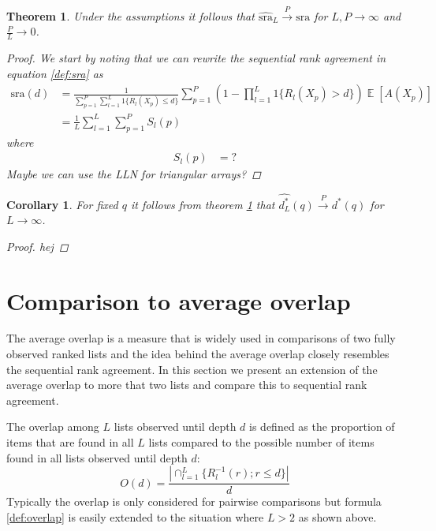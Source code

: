 \documentclass[12pt,a4paper]{article}
\DeclareMathOperator{\E}{\mathbb{E}}
\theoremstyle{plain}
\newtheorem{theorem}{Theorem}
\newtheorem{corollary}{Corollary}
\begin{document}
\begin{theorem}
Under the assumptions it follows that $\widehat{\textrm{sra}}_L \overset{P}{\longrightarrow} \textrm{sra}$ for $L,P\rightarrow \infty$ and $\frac{P}{L} \rightarrow 0$.
\begin{proof}
We start by noting that we can rewrite the sequential rank agreement in equation \ref{def:sra} as
\begin{align}
\textrm{sra}(d) &= \frac 1{\sum_{p=1}^P \sum_{l=1}^L 1\{R_l(X_p)\le d\}}\sum_{p=1}^P(1-\prod_{l=1}^L 1\{R_l(X_p)>d\}) \E[A(X_p)]\\
    &= \frac{1}{L} \sum_{l=1}^L \sum_{p=1}^P S_l(p)
\end{align}
where
\begin{align}
  S_l(p) &= ?
\end{align}
Maybe we can use the LLN for triangular arrays?
\end{proof}
\label{thm:consistency}
\end{theorem}


\begin{corollary}
For fixed $q$ it follows from theorem \ref{thm:consistency} that
$\widehat{d^\ast_L}(q) \overset{P}{\longrightarrow} d^\ast(q)$
for $L \rightarrow \infty$.
\begin{proof}
 hej
\end{proof}
\end{corollary}







\section{Comparison to average overlap}

The average overlap is a measure that is widely used in comparisons of
two fully observed ranked lists \citep{Fagin2003,Webber2010} and the
idea behind the average overlap closely resembles the sequential rank
agreement. In this section we present an extension of the average
overlap to more that two lists and compare this to sequential rank
agreement.

The overlap among $L$ lists observed until depth $d$ is defined as the
proportion of items that are found in all $L$ lists compared to the
possible number of items found in all lists observed until depth $d$:
\begin{equation}
  O(d) = \frac{| \cap_{l=1}^L \{R_l^{-1}(r); r\leq d \} |}{d}\label{def:overlap}
\end{equation}
Typically the overlap is only considered for pairwise comparisons
\citep{Bar-Ilan2006,Boulesteix2009} but formula \ref{def:overlap}
is easily extended to the situation where $L>2$ as shown above.
\end{document}
